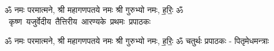 \documentclass[17pt]{extarticle}
\begin{document}
\begin{titlepage}
    \begin{center}
 
\begin{sanskrit}
    { \Large
    ॐ नमः परमात्मने, श्री महागणपतये नमः
श्री गुरुभ्यो नमः, ह॒रिः॒ ॐ 
    }
    \\
    \vspace{2.5cm}
    \mbox{ \Huge
    कृष्ण यजुर्वेदीय तैत्तिरीय आरण्यके प्रथमः प्रपाठकः   }
\end{sanskrit}
\end{center}

\end{titlepage}
\tableofcontents

ॐ नमः परमात्मने, श्री महागणपतये नमः
श्री गुरुभ्यो नमः, ह॒रिः॒ ॐ      चतुर्थः प्रपाठकः - पितृमेधमन्त्राः \newline

\end{document}
